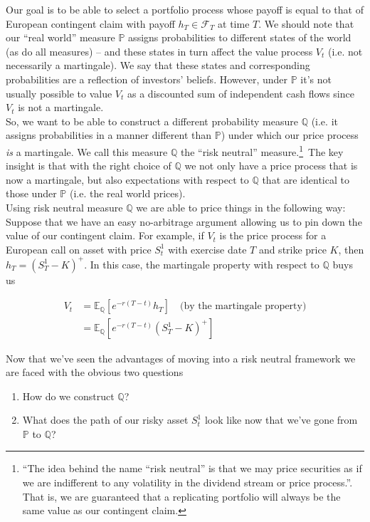 \documentclass[12pt]{article}
\newlength\tindent
\renewcommand{\indent}{\hspace*{\tindent}}
\begin{document}
\indent Our goal is to be able to select a portfolio process whose payoff is equal to that of European contingent claim with payoff $h_T \in \mathcal F_T$ at time $T$. We should note that our ``real world'' measure $\mathbb P$ assigns probabilities to different states of the world (as do all measures) -- and these states in turn affect the value process $V_t$ (i.e. not necessarily a martingale). We say that these states and corresponding probabilities are a reflection of investors' beliefs. However, under $\mathbb P$ it's not usually possible to value $V_t$ as a discounted sum of independent cash flows since $V_t$ is not a martingale. \\

\indent So, we want to be able to construct a different probability measure $\mathbb Q$ (i.e. it assigns probabilities in a manner different than $\mathbb P$) under which our price process {\em is} a martingale. We call this measure $\mathbb Q$ the ``risk neutral'' measure.\footnote{``The idea behind the name ``risk neutral'' is that we may price securities as if we are indifferent to any volatility in the dividend stream or price process.''. That is, we are guaranteed that a replicating portfolio will always be the same value as our contingent claim.}~The key insight is that with the right choice of $\mathbb Q$ we not only have a price process that is now a martingale, but also expectations with respect to $\mathbb Q$ that are identical to those under $\mathbb P$ (i.e. the real world prices). \\

\indent Using risk neutral measure $\mathbb Q$ we are able to price things in the following way: Suppose that we have an easy no-arbitrage argument allowing us to pin down the value of our contingent claim. For example, if $V_t$ is the price process for a European call on asset with price $S^1_t$ with exercise date $T$ and strike price $K$, then $h_T = (S^1_T - K)^+$. In this case, the martingale property with respect to $\mathbb Q$ buys us

\begin{align*}
	V_t &= \mathbb E_{\mathbb Q}[e^{-r(T - t)}h_T] \quad \text{(by the martingale property)} \\
	&= \mathbb E_{\mathbb Q}[e^{-r(T - t)}(S^1_T - K)^+]
\end{align*}

\indent Now that we've seen the advantages of moving into a risk neutral framework we are faced with the obvious two questions
\begin{enumerate}
	\item How do we construct $\mathbb Q$?
	\item What does the path of our risky asset $S^1_t$ look like now that we've gone from $\mathbb P$ to $\mathbb Q$?
\end{enumerate}
\end{document}

